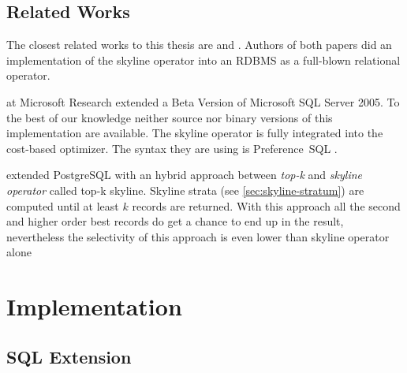 \section{Related Works}
The closest related works to this thesis are \citep{Chaudhuri2006}
and \citep{Goncalves2005, Goncalves2005a}.  Authors of both papers did an
implementation of the skyline operator into an RDBMS as a full-blown
relational operator.

\citet{Chaudhuri2006} at Microsoft Research extended a Beta
Version of Microsoft SQL Server 2005.  To the best of our knowledge
neither source nor binary versions of this implementation are
available.  The skyline operator is fully integrated into the
cost-based optimizer.  The syntax they are using is Preference~SQL 
\citep{Kiessling2002a}.


\citep{Goncalves2005} extended PostgreSQL with an hybrid approach 
between \emph{top-k} and \emph{skyline operator} called top-k skyline.
Skyline strata (see \autoref{sec:skyline-stratum}) are computed until
at least $k$ records are returned.  With this approach all the second
and higher order best records do get a chance to end up in the result,
nevertheless the selectivity of this approach is even lower than
skyline operator alone






\chapter{Implementation}
\label{chap:implementation}
\section{SQL Extension}
\label{sec:sql-extension}

\enlargethispage{\baselineskip}

